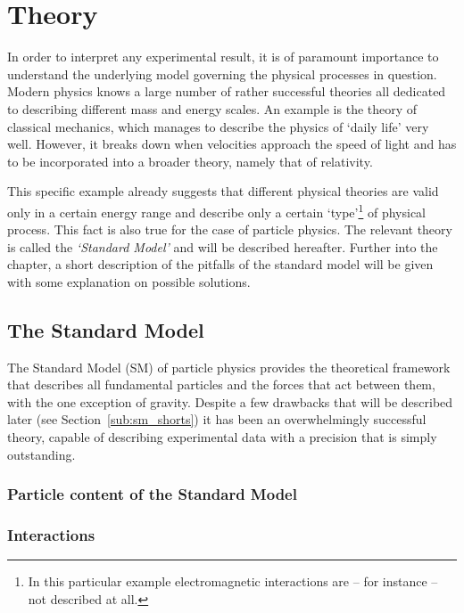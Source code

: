 \chapter{Theory}
\label{ch:theory}
In order to interpret any experimental result, it is of paramount importance to understand
the underlying model governing the physical processes in question. Modern physics knows a
large number of rather successful theories all dedicated to describing different mass and 
energy scales. An example is the theory of classical mechanics, which manages to describe the 
physics of `daily life' very well. However, it breaks down when velocities approach
the speed of light and has to be incorporated into a broader theory, namely that of relativity.

This specific example already suggests that different physical theories are valid only in a 
certain energy range and describe only a certain `type'\footnote{In this particular example
electromagnetic interactions are -- for instance -- not described at all.} of physical process. 
This fact is also true for the case of particle physics. The relevant theory is called the 
\textit{`Standard Model'} and will be described hereafter. Further into the chapter,
a short description of the pitfalls of the standard model will be given with some explanation
on possible solutions.

\section{The Standard Model}
\label{sec:standardmodel}
The Standard Model (SM) of particle physics provides the theoretical framework that
describes all fundamental particles and the forces that act between them, with the one
exception of gravity. Despite a few drawbacks that will be described later (see Section~\ref{sub:sm_shorts})
it has been an overwhelmingly successful theory, capable of describing experimental data
with a precision that is simply outstanding.

\subsection{Particle content of the Standard Model}
\label{sub:sm_particles}

\subsection{Interactions}
\label{sub:sm_interactions}

